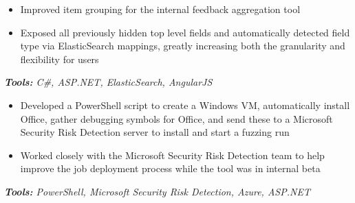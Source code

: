 \documentclass[10pt,letter]{altacv}
\begin{document}


\begin{itemize}
\item Improved item grouping for the internal feedback aggregation tool
\item Exposed all previously hidden top level fields and automatically detected field type via ElasticSearch mappings, greatly increasing both the granularity and flexibility for users
\end{itemize}
\textit{\textbf{Tools:} C\#, ASP.NET, ElasticSearch, AngularJS}

\begin{itemize}
\item Developed a PowerShell script to create a Windows VM, automatically install Office, gather debugging symbols for Office, and send these to a Microsoft \\ Security Risk Detection server to install and start a fuzzing run
\item Worked closely with the Microsoft Security Risk Detection team to help improve the job deployment process while the tool was in internal beta
\end{itemize}
\textit{\textbf{Tools:} PowerShell, Microsoft Security Risk Detection, Azure, ASP.NET}

\smallskip


\end{document}
